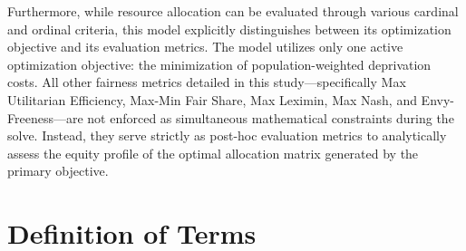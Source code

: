 Furthermore, while resource allocation can be evaluated through various cardinal and ordinal criteria, this model explicitly distinguishes between its optimization objective and its evaluation metrics. The model utilizes only one active optimization objective: the minimization of population-weighted deprivation costs. All other fairness metrics detailed in this study—specifically Max Utilitarian Efficiency, Max-Min Fair Share, Max Leximin, Max Nash, and Envy-Freeness—are not enforced as simultaneous mathematical constraints during the solve. Instead, they serve strictly as post-hoc evaluation metrics to analytically assess the equity profile of the optimal allocation matrix generated by the primary objective.

\section{Definition of Terms}

